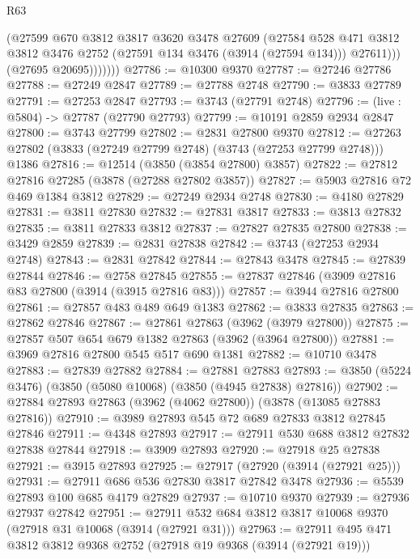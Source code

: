 \begin{lexlean}{R63}
\begin{coremodule}
                  (@27599
                    @670
                    @3812
                    @3817
                    @3620
                    @3478
                    @27609
                    (@27584
                      @528
                      @471
                      @3812
                      @3812
                      @3476
                      @2752
                      (@27591 @134 @3476 (@3914 (@27594 @134)))
                      @27611)))
                (@27695 @20695)))))))
@27786 := @10300 @9370
@27787 := @27246 @27786
@27788 := @27249 @2847
@27789 := @27788 @2748
@27790 := @3833 @27789
@27791 := @27253 @2847
@27793 := @3743 (@27791 @2748)
@27796 := (live : @5804) -> @27787 (@27790 @27793)
@27799 := @10191 @2859 @2934 @2847
@27800 := @3743 @27799
@27802 := @2831 @27800 @9370
@27812 := @27263 @27802 (@3833 (@27249 @27799 @2748) (@3743 (@27253 @27799 @2748))) @1386
@27816 := @12514 (@3850 (@3854 @27800) @3857)
@27822 := @27812 @27816 @27285 (@3878 (@27288 @27802 @3857))
@27827 := @5903 @27816 @72 @469 @1384 @3812
@27829 := @27249 @2934 @2748
@27830 := @4180 @27829
@27831 := @3811 @27830
@27832 := @27831 @3817
@27833 := @3813 @27832
@27835 := @3811 @27833 @3812
@27837 := @27827 @27835 @27800
@27838 := @3429 @2859
@27839 := @2831 @27838
@27842 := @3743 (@27253 @2934 @2748)
@27843 := @2831 @27842
@27844 := @27843 @3478
@27845 := @27839 @27844
@27846 := @2758 @27845
@27855 := @27837 @27846 (@3909 @27816 @83 @27800 (@3914 (@3915 @27816 @83)))
@27857 := @3944 @27816 @27800
@27861 := @27857 @483 @489 @649 @1383
@27862 := @3833 @27835
@27863 := @27862 @27846
@27867 := @27861 @27863 (@3962 (@3979 @27800))
@27875 := @27857 @507 @654 @679 @1382 @27863 (@3962 (@3964 @27800))
@27881 := @3969 @27816 @27800 @545 @517 @690 @1381
@27882 := @10710 @3478
@27883 := @27839 @27882
@27884 := @27881 @27883
@27893 := @3850 (@5224 @3476) (@3850 (@5080 @10068) (@3850 (@4945 @27838) @27816))
@27902 := @27884 @27893 @27863 (@3962 (@4062 @27800)) (@3878 (@13085 @27883 @27816))
@27910 := @3989 @27893 @545 @72 @689 @27833 @3812 @27845 @27846
@27911 := @4348 @27893
@27917 := @27911 @530 @688 @3812 @27832 @27838 @27844
@27918 := @3909 @27893
@27920 := @27918 @25 @27838
@27921 := @3915 @27893
@27925 := @27917 (@27920 (@3914 (@27921 @25)))
@27931 := @27911 @686 @536 @27830 @3817 @27842 @3478
@27936 := @5539 @27893 @100 @685 @4179 @27829
@27937 := @10710 @9370
@27939 := @27936 @27937 @27842
@27951 := @27911 @532 @684 @3812 @3817 @10068 @9370 (@27918 @31 @10068 (@3914 (@27921 @31)))
@27963 := @27911 @495 @471 @3812 @3812 @9368 @2752 (@27918 @19 @9368 (@3914 (@27921 @19)))

\end{coremodule}
\end{lexlean}

